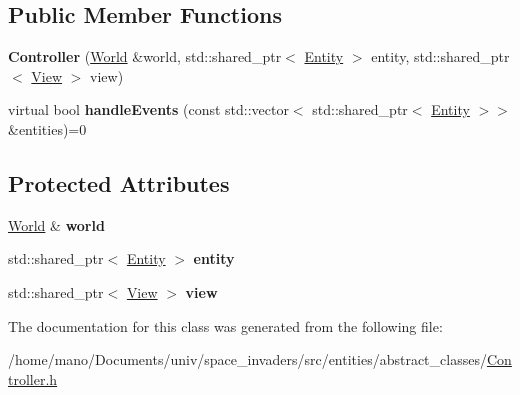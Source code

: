 \subsection*{Public Member Functions}
\begin{DoxyCompactItemize}
\item 
\mbox{\label{classentities_1_1Controller_ab13d103795b6d18dff0849e94c043e3f}} 
{\bfseries Controller} (\hyperlink{classWorld}{World} \&world, std\+::shared\+\_\+ptr$<$ \hyperlink{classentities_1_1Entity}{Entity} $>$ entity, std\+::shared\+\_\+ptr$<$ \hyperlink{classentities_1_1View}{View} $>$ view)
\item 
\mbox{\label{classentities_1_1Controller_a8e92d8a8e3b215295708a4cf25abcf4f}} 
virtual bool {\bfseries handle\+Events} (const std\+::vector$<$ std\+::shared\+\_\+ptr$<$ \hyperlink{classentities_1_1Entity}{Entity} $>$$>$ \&entities)=0
\end{DoxyCompactItemize}
\subsection*{Protected Attributes}
\begin{DoxyCompactItemize}
\item 
\mbox{\label{classentities_1_1Controller_a6490e859b0c6d8e96ecc46d68585a81e}} 
\hyperlink{classWorld}{World} \& {\bfseries world}
\item 
\mbox{\label{classentities_1_1Controller_af114a0e2ca717f637b518c25bfa0c89a}} 
std\+::shared\+\_\+ptr$<$ \hyperlink{classentities_1_1Entity}{Entity} $>$ {\bfseries entity}
\item 
\mbox{\label{classentities_1_1Controller_a8af4452aef4ef06e9798889fca6ea48d}} 
std\+::shared\+\_\+ptr$<$ \hyperlink{classentities_1_1View}{View} $>$ {\bfseries view}
\end{DoxyCompactItemize}


The documentation for this class was generated from the following file\+:\begin{DoxyCompactItemize}
\item 
/home/mano/\+Documents/univ/space\+\_\+invaders/src/entities/abstract\+\_\+classes/\hyperlink{Controller_8h}{Controller.\+h}\end{DoxyCompactItemize}
